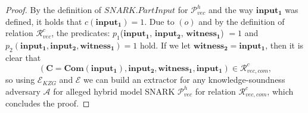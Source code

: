 \begin{proof}
\noindent By the definition of $\mathit{SNARK.PartInput}$ for $\mathscr{P}_{\mathit{vec}}^{h}$ and the way $\mathbf{input_1}$ was defined, 
it holds that $c(\mathbf{input_1}) = 1$. Due to $(o)$ and by the definition of relation $\mathcal{R}_{\mathit{vec}}^{c}$, 
the predicates: $p_1$($\mathbf{input_1}$, $\mathbf{input_2}$, $\mathbf{witness_1}$) $= 1$ and 
$p_2(\mathbf{input_1}, \mathbf{input_2}, \mathbf{witness_1}) = 1$ hold. If we let 
$\mathbf{witness_2} = \mathbf{input_1}$, then it is clear that 
$$(\mathbf{C} = \mathbf{Com}(\mathbf{input_1}), \mathbf{input_2}, \mathbf{witness_1}, \mathbf{input_1}) \in \mathcal{R}_{\mathit{vec}, \mathit{com}}^c,$$ so 
using $\mathcal{E}_{\mathit{KZG}}$ and $\mathcal{E}$ we can build an extractor for any knowledge-soundness adversary $\mathcal{A}$ for alleged 
hybrid model SNARK $\mathscr{P}_{\mathit{vec}}^{h}$ for relation $\mathcal{R}_{\mathit{vec}, \mathit{com}}^c$, which concludes the proof.
\end{proof}


